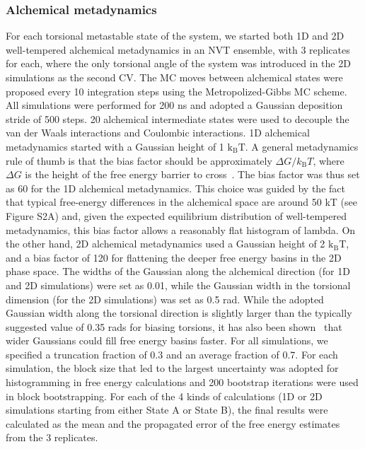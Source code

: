\documentclass[journal=jacsat,manuscript=article]{achemso}
\begin{document}
\subsubsection{Alchemical metadynamics}
For each torsional metastable state of the system, we started both 1D and 2D well-tempered alchemical metadynamics in an NVT ensemble, with 3 replicates for each, where the only torsional angle of the system was introduced in the 2D simulations as the second CV. The MC moves between alchemical states were proposed every 10 integration steps using the Metropolized-Gibbs MC scheme. All simulations were performed for 200 ns and adopted a Gaussian deposition stride of 500 steps. 20 alchemical intermediate states were used to decouple the van der Waals interactions and Coulombic interactions. 1D alchemical metadynamics started with a Gaussian height of 1 $\text{k}_{\text{B}}\text{T}$. A general metadynamics rule of thumb is that the bias factor should be approximately $\Delta G/k_{\text{B}}T$, where $\Delta G$ is the height of the free energy barrier to cross~\cite{WTMetaD}.  The bias factor was thus set as 60 for the 1D alchemical metadynamics. This choice was guided by the fact that typical free-energy differences in the alchemical space are around 50 kT (see Figure S2A) and, given the expected equilibrium distribution of well-tempered metadynamics, this bias factor allows a reasonably flat histogram of lambda. On the other hand, 2D alchemical metadynamics used a Gaussian height of 2 $\text{k}_{\text{B}}\text{T}$, and a bias factor of 120 for flattening the deeper free energy basins in the 2D phase space. The widths of the Gaussian along the alchemical direction (for 1D and 2D simulations) were set as 0.01, while the Gaussian width in the torsional dimension (for the 2D simulations) was set as 0.5 rad. While the adopted Gaussian width along the torsional direction is slightly larger than the typically suggested value of 0.35 rads for biasing torsions, it has also been shown~\cite{branduardi2012metadynamics} that wider Gaussians could fill free energy basins faster. For all simulations, we specified a truncation fraction of 0.3 and an average fraction of 0.7. For each simulation, the block size that led to the largest uncertainty was adopted for histogramming in free energy calculations and 200 bootstrap iterations were used in block bootstrapping. For each of the 4 kinds of calculations (1D or 2D simulations starting from either State A or State B), the final results were calculated as the mean and the propagated error of the free energy estimates from the 3 replicates.
\end{document}
